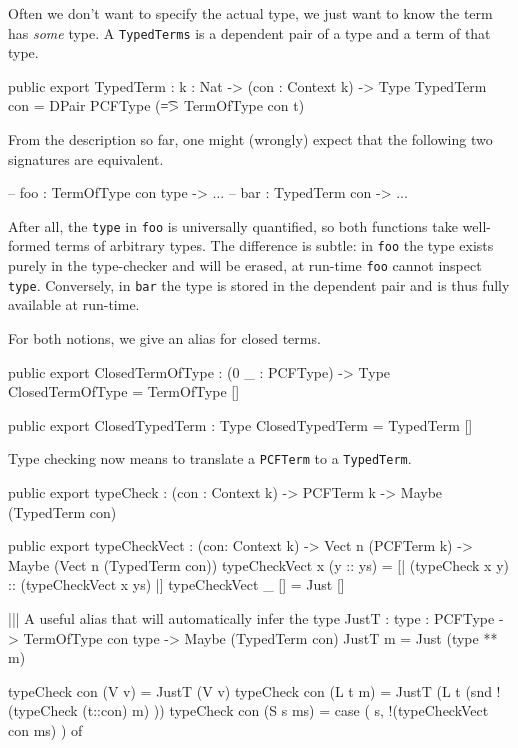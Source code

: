 Often we don't want to specify the actual type, we just want to know the term has \emph{some} type.
A \lstinline{TypedTerms} is a dependent pair of a type and a term of that type.
\begin{code}
public export
TypedTerm : {k : Nat} -> (con : Context k) -> Type
TypedTerm con = DPair PCFType (\t => TermOfType con t)
\end{code}

From the description so far, one might (wrongly) expect that the following two signatures are equivalent.
\begin{code}
-- foo : TermOfType con type -> ...
-- bar : TypedTerm con    -> ...
\end{code}
After all, the \lstinline{type} in \lstinline{foo} is universally quantified, so both functions take well-formed terms of arbitrary types.
The difference is subtle: in \lstinline{foo} the type exists purely in the type-checker and will be erased, at run-time \lstinline{foo} cannot inspect \lstinline{type}. Conversely, in \lstinline{bar} the type is stored in the dependent pair and is thus fully available at run-time.


For both notions, we give an alias for closed terms.

\begin{code}
public export
ClosedTermOfType : (0 _ : PCFType) -> Type
ClosedTermOfType = TermOfType []

public export
ClosedTypedTerm : Type
ClosedTypedTerm = TypedTerm []
\end{code}

Type checking now means to translate a \lstinline{PCFTerm} to a \lstinline{TypedTerm}.

\begin{code}
public export
typeCheck : (con : Context k) -> PCFTerm k -> Maybe (TypedTerm con)

public export
typeCheckVect : (con: Context k) -> Vect n (PCFTerm k) -> Maybe (Vect n (TypedTerm con))
typeCheckVect x (y :: ys) = [| (typeCheck x y) :: (typeCheckVect x ys) |]
typeCheckVect _ []        = Just []

||| A useful alias that will automatically infer the type
JustT : {type : PCFType} -> TermOfType con type -> Maybe (TypedTerm con)
JustT m = Just (type ** m)

typeCheck con (V v)    = JustT (V v) 
typeCheck con (L t m)  = JustT (L t (snd !(typeCheck (t::con) m) ))
typeCheck con (S s ms) = case ( s,  !(typeCheckVect con ms) ) of
\end{code}


